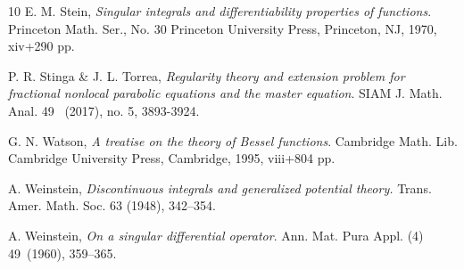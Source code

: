 \documentclass[11pt,letter]{amsart}
\numberwithin{equation}{section}
\numberwithin{equation}{section}
\begin{document}
\begin{thebibliography}{10}
E. M. Stein, \emph{Singular integrals and differentiability properties of functions}.
Princeton Math. Ser., No. 30
Princeton University Press, Princeton, NJ, 1970, xiv+290 pp.

P. R. Stinga \& J. L. Torrea, \emph{Regularity theory and extension problem for fractional nonlocal parabolic equations and the master equation}.
SIAM J. Math. Anal. 49 ~(2017), no. 5, 3893-3924.

G. N. Watson,  \emph{A treatise on the theory of Bessel functions}.
Cambridge Math. Lib.
Cambridge University Press, Cambridge, 1995, viii+804 pp.

A. Weinstein,  \emph{Discontinuous integrals and generalized potential theory.} Trans. Amer. Math. Soc. 63 (1948), 342--354.

A. Weinstein,  \emph{On a singular differential operator}.
Ann. Mat. Pura Appl. (4) 49~(1960), 359--365.



\end{thebibliography}
\end{document}
